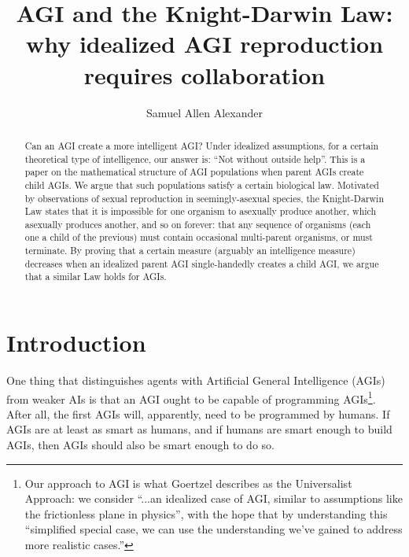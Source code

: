 \documentclass[runningheads]{llncs}
\begin{document}
\title{AGI and the Knight-Darwin Law: why idealized AGI reproduction requires
collaboration}

\author{Samuel Allen Alexander}

\maketitle

\begin{abstract}
Can an AGI create a more intelligent AGI?
Under idealized assumptions, for a certain theoretical
type of intelligence, our answer is:
``Not without outside help''.
This is a paper on the mathematical structure of AGI populations
when parent AGIs create child AGIs. We argue that such populations
satisfy a certain biological law.
Motivated by observations of sexual reproduction in seemingly-asexual
species,
the Knight-Darwin Law states that it is impossible for one organism
to asexually produce another, which asexually produces another,
and so on forever:
that any sequence of organisms (each one a child of the previous) must contain
occasional multi-parent organisms, or must terminate.
By proving that a certain measure (arguably an intelligence measure)
decreases when an
idealized parent AGI single-handedly creates a child AGI,
we argue that a similar Law holds for AGIs.


\end{abstract}

\section{Introduction}

One thing that distinguishes agents with Artificial General Intelligence (AGIs)
from weaker AIs is that an
AGI ought to be capable of programming AGIs\footnote{Our approach to AGI is what
Goertzel \cite{goertzel2014artificial} describes
as the Universalist Approach:
we consider ``...an idealized case of AGI, similar to
assumptions like the frictionless plane in physics'', with the hope that by
understanding this ``simplified special
case, we can use the understanding we've gained to address more realistic
cases.''}. After all, the first AGIs will,
apparently, need to be programmed by humans. If AGIs are at least as smart as
humans, and if humans are smart enough to
build AGIs, then AGIs should also be smart enough to do so.
\end{document}
